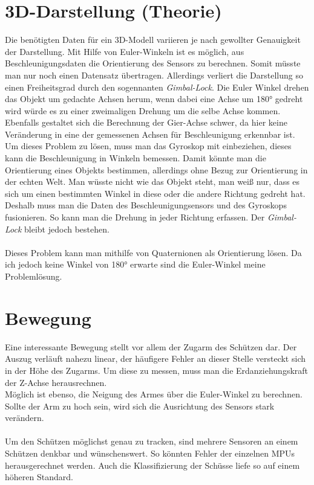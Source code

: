 \section{3D-Darstellung (Theorie)}
Die benötigten Daten für ein 3D-Modell variieren je nach gewollter Genauigkeit der Darstellung.
Mit Hilfe von Euler-Winkeln ist es möglich, aus Beschleunigungsdaten die Orientierung des Sensors zu berechnen.
Somit müsste man nur noch einen Datensatz übertragen. Allerdings verliert die Darstellung so einen
Freiheitsgrad durch den sogennanten \textit{Gimbal-Lock}. Die Euler Winkel drehen das Objekt um gedachte
Achsen herum, wenn dabei eine Achse um 180° gedreht wird würde es zu einer zweimaligen Drehung
um die selbe Achse kommen. Ebenfalls gestaltet sich die Berechnung der Gier-Achse schwer, da hier
keine Veränderung in eine der gemessenen Achsen für Beschleunigung erkennbar ist.
\\
Um dieses Problem zu lösen, muss man das Gyroskop mit einbeziehen, dieses kann die Beschleunigung
in Winkeln bemessen. Damit könnte man die Orientierung eines Objekts bestimmen, allerdings ohne 
Bezug zur Orientierung in der echten Welt. Man wüsste nicht wie das Objekt steht, man weiß nur, 
dass es sich um einen bestimmten Winkel in diese oder die andere Richtung gedreht hat. \\
Deshalb muss man die Daten des Beschleunigungsensors und des Gyroskops fusionieren. So kann man 
die Drehung in jeder Richtung erfassen. Der \textit{Gimbal-Lock} bleibt jedoch bestehen.\\
\\
Dieses Problem kann man mithilfe von Quaternionen als Orientierung lösen. Da ich jedoch keine 
Winkel von 180° erwarte sind die Euler-Winkel meine Problemlösung.

\section {Bewegung}
Eine interessante Bewegung stellt vor allem der Zugarm des 
Schützen dar. Der Auszug verläuft nahezu linear, der häufigere Fehler 
an dieser Stelle versteckt sich in der Höhe des Zugarms. 
Um diese zu messen, muss man die Erdanziehungskraft der Z-Achse herausrechnen.\\
Möglich ist ebenso, die Neigung des Armes über die Euler-Winkel zu berechnen. Sollte 
der Arm zu hoch sein, wird sich die Ausrichtung des Sensors stark verändern.\\
\\
Um den Schützen möglichst genau zu tracken, sind mehrere Sensoren an einem Schützen denkbar und
wünschenswert. So könnten Fehler der einzelnen MPUs herausgerechnet werden.
Auch die Klassifizierung der Schüsse liefe so auf einem höheren Standard.